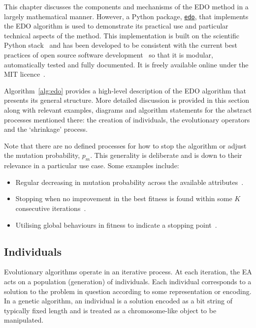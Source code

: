 This chapter discusses the components and mechanisms of the EDO method in a
largely mathematical manner. However, a Python package,
\href{https://github.com/daffidwilde/edo}{\texttt{edo}}, that
implements the EDO algorithm is used to demonstrate its practical use and
particular technical aspects of the method. This implementation is built on the
scientific Python stack~\cite{pandas,numpy} and has been developed to be
consistent with the current best practices of open source software
development~\cite{Jimenez2017} so that it is modular, automatically tested and
fully documented. It is freely available online under the MIT
licence~\cite{edo-project}.

Algorithm~\ref{alg:edo} provides a high-level description of the EDO algorithm
that presents its general structure. More detailed discussion is provided in
this section along with relevant examples, diagrams and algorithm statements for
the abstract processes mentioned there: the creation of individuals, the
evolutionary operators and the `shrinkage' process.


Note that there are no defined processes for how to stop the
algorithm or adjust the mutation probability, \(p_m\). This generality is
deliberate and is down to their relevance in a particular use case. Some
examples include:
\begin{itemize}
    \item Regular decreasing in mutation probability across the available
        attributes~\cite{Kuehn2013}.
    \item Stopping when no improvement in the best fitness is found within some
        \(K\) consecutive iterations~\cite{Leung2001}.
    \item Utilising global behaviours in fitness to indicate a stopping
        point~\cite{Marti2016}.
\end{itemize}


\subsection{Individuals}

Evolutionary algorithms operate in an iterative process. At each iteration, the
EA acts on a population (generation) of individuals. Each individual corresponds
to a solution to the problem in question according to some representation or
encoding. In a genetic algorithm, an individual is a solution encoded as a bit
string of typically fixed length and is treated as a chromosome-like object to
be manipulated.

